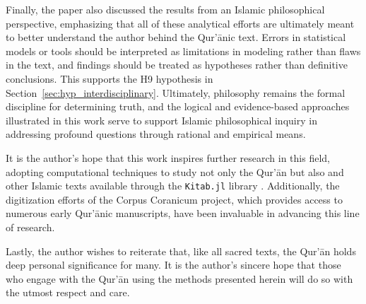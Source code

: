 Finally, the paper also discussed the results from an Islamic philosophical perspective, emphasizing that all of these analytical efforts are ultimately meant to better understand the author behind the Qur'\=anic text. Errors in statistical models or tools should be interpreted as limitations in modeling rather than flaws in the text, and findings should be treated as hypotheses rather than definitive conclusions. This supports the H9 hypothesis in Section~\ref{sec:hyp_interdisciplinary}. Ultimately, philosophy remains the formal discipline for determining truth, and the logical and evidence-based approaches illustrated in this work serve to support Islamic philosophical inquiry in addressing profound questions through rational and empirical means.

It is the author's hope that this work inspires further research in this field, adopting computational techniques to study not only the Qur'\=an but also   and other Islamic texts available through the \texttt{Kitab.jl} library \cite{al_ahmadgaid_b_asaad_kitab}. Additionally, the digitization efforts of the Corpus Coranicum project, which provides access to numerous early Qur'\=anic manuscripts, have been invaluable in advancing this line of research.

Lastly, the author wishes to reiterate that, like all sacred texts, the Qur'\=an holds deep personal significance for many. It is the author's sincere hope that those who engage with the Qur'\=an using the methods presented herein will do so with the utmost respect and care.

